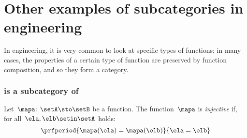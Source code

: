 
\section[Other examples]{Other examples of subcategories in engineering}

In engineering, it is very common to look at specific types of functions; in many cases, the properties of a certain type of function are preserved by function composition, and so they form a category.

\subsubsection{\Injset is a subcategory of \Set}
\begin{definition}
    \label{def:injective-function}
    Let~$\mapa \colon \setA \sto \setB$ be a function.
    The function~$\mapa$ is \emph{injective} if, for all~$\ela,\elb\setin \setA$ holds:
    \begin{equation}
        \prfperiod{
            \mapa(\ela)=\mapa(\elb)
        }{
            \ela=\elb
        }
    \end{equation}
\end{definition}

